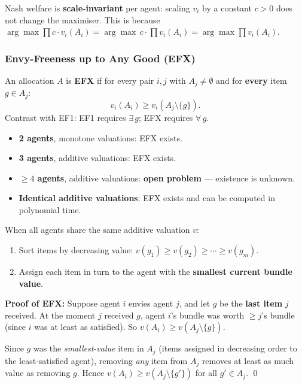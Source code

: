\begin{tipbox}
Nash welfare is \textbf{scale-invariant} per agent: scaling $v_i$ by a constant $c > 0$ does not change the maximiser. This is because $\arg\max \prod c \cdot v_i(A_i) = \arg\max \, c \cdot \prod v_i(A_i) = \arg\max \prod v_i(A_i)$.
\end{tipbox}

\separator

\subsubsection{Envy-Freeness up to Any Good (EFX)}

\begin{defbox}
An allocation $A$ is \textbf{EFX} if for every pair $i, j$ with $A_j \neq \emptyset$ and for \textbf{every} item $g \in A_j$:
\[
  v_i(A_i) \geq v_i(A_j \setminus \{g\}).
\]
Contrast with EF1: EF1 requires $\exists\, g$; EFX requires $\forall\, g$.
\end{defbox}

\begin{tipbox}
\begin{itemize}
  \item \textbf{2 agents}, monotone valuations: EFX exists.
  \item \textbf{3 agents}, additive valuations: EFX exists.
  \item \textbf{$\geq 4$ agents}, additive valuations: \textbf{open problem} --- existence is unknown.
  \item \textbf{Identical additive valuations}: EFX exists and can be computed in polynomial time.
\end{itemize}
\end{tipbox}

\begin{thmbox}
When all agents share the same additive valuation $v$:
\begin{enumerate}
  \item Sort items by decreasing value: $v(g_1) \geq v(g_2) \geq \cdots \geq v(g_m)$.
  \item Assign each item in turn to the agent with the \textbf{smallest current bundle value}.
\end{enumerate}
\textbf{Proof of EFX:} Suppose agent $i$ envies agent $j$, and let $g$ be the \textbf{last item} $j$ received. At the moment $j$ received $g$, agent $i$'s bundle was worth $\geq j$'s bundle (since $i$ was at least as satisfied). So $v(A_i) \geq v(A_j \setminus \{g\})$.

Since $g$ was the \emph{smallest-value} item in $A_j$ (items assigned in decreasing order to the least-satisfied agent), removing \emph{any} item from $A_j$ removes at least as much value as removing $g$. Hence $v(A_i) \geq v(A_j \setminus \{g'\})$ for all $g' \in A_j$. \qed
\end{thmbox}


